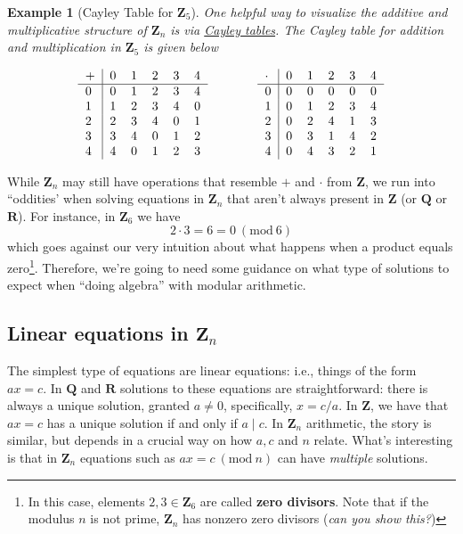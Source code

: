 \documentclass[12pt]{article}
\numberwithin{equation}{subsection}
\theoremstyle{note}
\newtheorem{example}[subsection]{Example}
\newcommand{\Mod}[1]{\ (\mathrm{mod}\ #1)}
\begin{document}
\begin{example}[Cayley Table for $\mathbf{Z}_5$]One helpful way to visualize the additive and multiplicative structure of $\mathbf{Z}_n$ is via \href{https://en.wikipedia.org/wiki/Cayley_table}{\textit{Cayley tables}}. The Cayley table for addition and multiplication in $\mathbf{Z}_5$ is given below


\begin{equation}
	\begin{tabular}{ l | l l l l l } 
	+ & 0 & 1 & 2 & 3 & 4\\ \hline
	0 & 0 & 1 & 2 & 3 & 4 \\ 
	1 & 1 & 2 & 3 & 4 & 0 \\ 
	2 & 2 & 3 & 4  & 0 & 1 \\
	3 & 3 & 4 & 0 & 1 & 2\\
	4 & 4 & 0 & 1 & 2 & 3 \end{tabular}
	\qquad \qquad 
		\begin{tabular}{ l | l l l l l } 
	$\cdot$ & 0 & 1 & 2 & 3 & 4\\ \hline
	0 & 0 & 0 & 0 & 0 & 0 \\ 
	1 & 0 & 1 & 2 & 3 & 4 \\ 
	2 & 0 & 2 & 4  & 1 & 3 \\
	3 & 0 & 3 & 1 & 4 & 2\\
	4 & 0 & 4 & 3 & 2 & 1  \end{tabular}
\end{equation}
\end{example}

While $\mathbf{Z}_n$ may still have operations that resemble $+$ and $\cdot$ from $\mathbf{Z}$, we run into ``oddities' when solving equations in $\mathbf{Z}_n$ that aren't always present in $\mathbf{Z}$ (or $\mathbf{Q}$ or $\mathbf{R}$). For instance, in $\mathbf{Z}_6$ we have \[2\cdot 3= 6=0\Mod{6}\] which goes against our very intuition about what happens when a product equals zero\footnote{In this case, elements $2,3\in\mathbf{Z}_6$ are called \textbf{zero divisors}. Note that if the modulus $n$ is not prime, $\mathbf{Z}_n$ has nonzero zero divisors (\textit{can you show this?})}. Therefore, we're going to need some guidance on what type of solutions to expect when ``doing algebra'' with modular arithmetic. 

\subsection{Linear equations in $\mathbf{Z}_n$}
The simplest type of equations are linear equations: i.e., things of the form $ax=c$. In $\mathbf{Q}$ and $\mathbf{R}$ solutions to these equations are straightforward: there is always a unique solution, granted $a\neq 0$, specifically, $x=c/a$. In $\mathbf{Z}$, we have that $ax=c$ has a unique solution if and only if $a\mid c$. In $\mathbf{Z}_n$ arithmetic, the story is similar, but depends in a crucial way on how $a,c$ and $n$ relate. What's interesting is that in $\mathbf{Z}_n$ equations such as $ax=c\Mod{n}$ can have \textit{multiple} solutions. 
\end{document}
